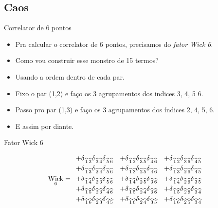 \documentclass{beamer}
\DeclareMathOperator{\Wick}{Wick}
\def\mi#1{{\,\widehat{#1}}}
\def\ddelta#1#2{\delta_{\mi{#1}\mi{#2}}}
\begin{document}
\subsection{Caos}

\begin{frame}
	\tableofcontents[currentsubsection]
\end{frame}

\begin{frame}{Correlator de 6 pontos}
\begin{itemize}
	\item Pra calcular o correlator de 6 pontos, precisamos do \textit{fator Wick 6}. 
	\item Como vou construir esse monstro de 15 termos?
	\item Usando a ordem dentro de cada par.
	\item Fixo o par (1,2) e faço os 3 agrupamentos dos indices 3, 4, 5 6.
	\item Passo pro par (1,3) e faço os 3 agrupamentos dos índices 2, 4, 5, 6.
	\item E assim por diante.
\end{itemize}	
\end{frame}

\begin{frame}{Fator Wick 6}
	
	\begin{equation*}
		\Wick_6 = 
		\begin{array}{c c c}
			+ \ddelta12 \ddelta34 \ddelta56 & +\ddelta12 \ddelta35 \ddelta46 & +\ddelta12 \ddelta36 \ddelta45 \\[1mm]
			+ \ddelta13 \ddelta24 \ddelta56 & +\ddelta13 \ddelta25 \ddelta46 & +\ddelta13 \ddelta26 \ddelta45 \\[1mm]
			+ \ddelta14 \ddelta23 \ddelta56 & +\ddelta14 \ddelta25 \ddelta36 & +\ddelta14 \ddelta26 \ddelta35 \\[1mm]
			+ \ddelta15 \ddelta23 \ddelta46 & +\ddelta15 \ddelta24 \ddelta36 & +\ddelta15 \ddelta26 \ddelta34 \\[1mm]
			+ \ddelta16 \ddelta23 \ddelta45 & +\ddelta16 \ddelta24 \ddelta35 & +\ddelta16 \ddelta25 \ddelta34
		\end{array}
	\end{equation*}
\end{frame}
\end{document}
